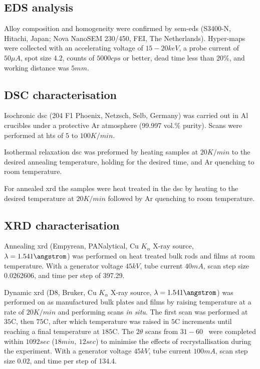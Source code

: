 \documentclass[a4paper,12pt,oneside]{report}%
\begin{document}
\subsection{EDS analysis}
Alloy composition and homogeneity were confirmed by \acrshort{sem}-\acrshort{eds} (S3400-N, Hitachi, Japan; Nova NanoSEM 230/450, FEI, The Netherlands). Hyper-maps were collected with an accelerating voltage of $15-20keV$, a probe current of $50 \mu A$, spot size 4.2, counts of $5000cps$ or better, dead time less than 20\%, and working distance was $5mm$.

\subsection{DSC characterisation}
Isochronic \acrshort{dsc} (204 F1 Phoenix, Netzsch, Selb, Germany) was carried out in Al crucibles under a protective Ar atmosphere (99.997 vol.\% purity). Scans were performed at \glspl{ht} of $5$ to $100 K/min$. 

Isothermal relaxation \acrshort{dsc} was preformed by heating samples at $20 K/min$ to the desired annealing temperature, holding for the desired time, and Ar quenching to room temperature.

For annealed \acrshort{xrd} the samples were heat treated in the \acrshort{dsc} by heating to the desired temperature at $20 K/min$ followed by Ar quenching to room temperature.

\subsection{XRD characterisation}
Annealing \acrshort{xrd} (Empyrean, PANalytical, Cu $K_{\alpha}$ X-ray source, $\lambda = 1.541 \angstrom$) was performed on heat treated bulk rods and films at room temperature. 
With a generator voltage $45 kV$, tube current $40 mA$, scan step size 0.0262606, and time per step of 397.29. 

Dynamic \acrshort{xrd} (D8, Bruker, Cu $K_{\alpha}$ X-ray source, $\lambda = 1.541 \angstrom$) was performed on as manufactured bulk plates and films by raising temperature at a rate of $20 K/min$ and performing scans \textit{in situ}. The first scan was performed at $35$\degree C, then $75$\degree C, after which temperature was raised in $5$\degree C increments until reaching a final temperature at $185$\degree C. The $2 \theta$ scans from $31 - 60$\degree~ were completed within $1092 sec$ ($18min,~ 12sec$) to minimise the effects of recrystallisation during the experiment.
With a generator voltage $45 kV$, tube current $100 mA$, scan step size 0.02, and time per step of 134.4. 
\end{document}
